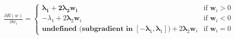 \documentclass[preview]{standalone}
\begin{document}
\begin{align*}
\frac{\partial R(w)}{\partial w_i} =\begin{cases}\mathbf{\lambda_1} + \mathbf{2\lambda_2} \mathbf{w_i} & \text{if } \mathbf{w}_i > 0 \\-\lambda_1 + 2\mathbf{\lambda}_2 \mathbf{w}_i & \text{if } \mathbf{w}_i < 0 \\\textbf{undefined (subgradient in } [-\boldsymbol{\lambda}_1, \boldsymbol{\lambda}_1]\textbf{)} + 2\mathbf{\lambda}_2 \mathbf{w}_i & \text{if } \mathbf{w}_i = 0\end{cases}
\end{align*}
\end{document}

